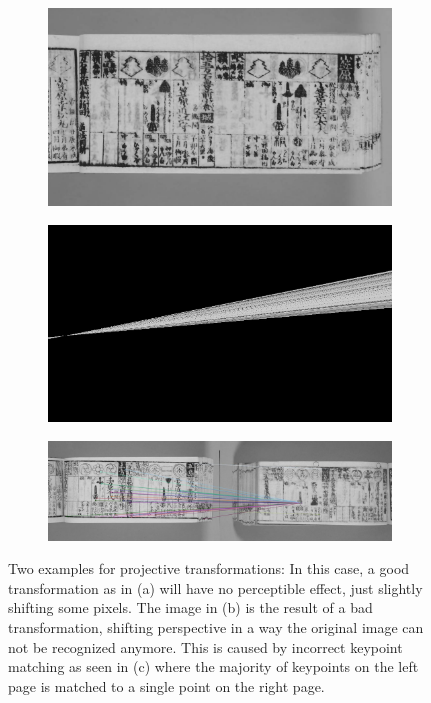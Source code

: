 \documentclass{ltjarticle}
\begin{document}
\begin{figure}
    \centering
    \begin{subfigure}{.49\textwidth}
        \includegraphics[width=\textwidth]{homography-good.jpg}
        \caption{}
    \end{subfigure}
    \begin{subfigure}{.49\textwidth}
        \includegraphics[width=\textwidth]{homography-bad.png}
        \caption{}
    \end{subfigure}
    \begin{subfigure}{\textwidth}
        \includegraphics[width=\textwidth]{homography-cause.jpg}
        \caption{}
    \end{subfigure}
    \caption[Projective transformation examples]{Two examples for projective transformations: In this case, a good transformation as in (a) will have no perceptible effect, just slightly shifting some pixels. The image in (b) is the result of a bad transformation, shifting perspective in a way the original image can not be recognized anymore. This is caused by incorrect keypoint matching as seen in (c) where the majority of keypoints on the left page is matched to a single point on the right page.}
    \label{fig:homography-compare}
\end{figure}
\end{document}
